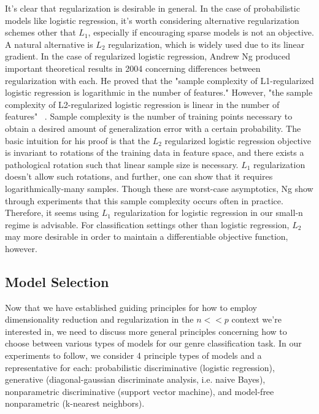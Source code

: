 \documentclass[]{article}
\begin{document}
	It's clear that regularization is desirable in general. In the case of probabilistic models like logistic regression, it's worth considering alternative regularization schemes other that $L_1$, especially if encouraging sparse models is not an objective. A natural alternative is $L_2$ regularization, which is widely used due to its linear gradient. In the case of regularized logistic regression, Andrew Ng produced important theoretical results in 2004 concerning differences between regularization with each. He proved that the "sample complexity of L1-regularized logistic regression is logarithmic in the number of features." However,  "the sample complexity of L2-regularized logistic regression is linear in the number of features"  ~\cite{ng2004feature}. Sample complexity is the number of training points necessary to obtain a desired amount of generalization error with a certain probability. The basic intuition for his proof is that the $L_2$ regularized logistic regression objective is invariant to rotations of the training data in feature space, and there exists a pathological rotation such that linear sample size is necessary. $L_1$ regularization doesn't allow such rotations, and further, one can show that it requires logarithmically-many samples. Though these are worst-case asymptotics, Ng show through experiments that  this sample complexity occurs often in practice. Therefore, it seems using $L_1$ regularization for logistic regression in our small-n regime is advisable. For classification settings other than logistic regression, $L_2$ may more desirable in order to maintain a differentiable objective function, however. 

\subsection{Model Selection}
	Now that we have established guiding principles for how to employ dimensionality reduction and regularization in the $n << p$ context we're interested in, we need to discuss more general principles concerning how to choose between various types of models for our genre classification task. In our experiments to follow, we consider 4 principle types of models and a representative for each: probabilistic discriminative (logistic regression), generative (diagonal-gaussian discriminate analysis, i.e. naive Bayes), nonparametric discriminative (support vector machine), and model-free nonparametric (k-nearest neighbors). 
\end{document}
